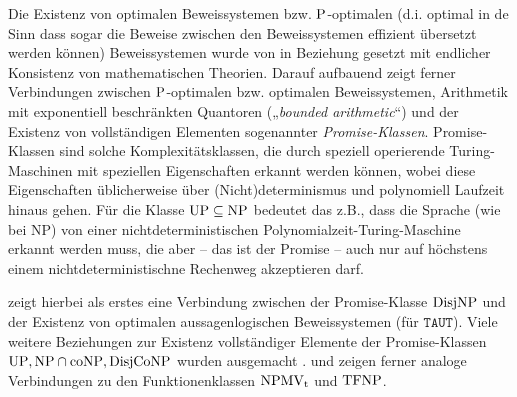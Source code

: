 Die Existenz von optimalen Beweissystemen bzw. $\P$-optimalen (d.i. optimal in de Sinn dass sogar die Beweise zwischen den Beweissystemen effizient übersetzt werden können) Beweissystemen  wurde von \textcite{krajicek_propositional_1989} in Beziehung gesetzt mit endlicher Konsistenz von mathematischen Theorien. Darauf aufbauend zeigt \textcites[Kap.~6]{pudlak_logical_2013}{pudlak_incompleteness_2017} ferner Verbindungen zwischen $\P$-optimalen bzw. optimalen Beweissystemen, Arithmetik mit exponentiell beschränkten Quantoren („\emph{bounded arithmetic}“) und der Existenz von vollständigen Elementen sogenannter \emph{Promise-Klassen}. Promise-Klassen sind solche Komplexitätsklassen, die durch speziell operierende Turing-Maschinen mit speziellen Eigenschaften erkannt werden können, wobei diese Eigenschaften üblicherweise über (Nicht)determinismus und polynomiell Laufzeit hinaus gehen. Für die Klasse $\UP\subseteq\NP$ bedeutet das z.B., dass die Sprache (wie bei NP) von einer nichtdeterministischen Polynomialzeit-Turing-Maschine erkannt werden muss, die aber -- das ist der Promise -- auch nur auf höchstens einem nichtdeterministischne Rechenweg akzeptieren darf.

\textcite{razborov_provably_1994} zeigt hierbei als erstes eine Verbindung zwischen der Promise-Klasse $\DisjNP$ und der Existenz von optimalen aussagenlogischen Beweissystemen (für $\mathtt{TAUT}$). Viele weitere Beziehungen zur Existenz vollständiger Elemente der Promise-Klassen $\UP, \NP\cap\coNP, \DisjCoNP$ wurden ausgemacht \parencites(vgl. auch)(){messner_simulation_2001}{kobler_optimal_2003}{beyersdorff_there_2011}.
\textcite{beyersdorff_nondeterministic_2009} und \textcite{pudlak_incompleteness_2017} zeigen ferner analoge Verbindungen zu den Funktionenklassen $\NPMVt$ und $\TFNP$.

